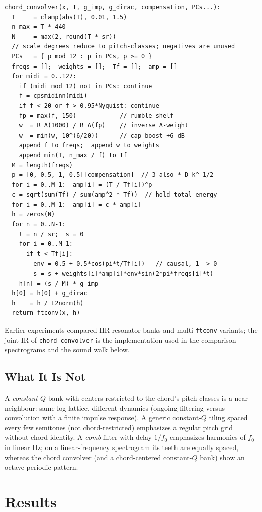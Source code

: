 \documentclass[runningheads,a4paper]{llncs}
\begin{document}
\begin{verbatim}
chord_convolver(x, T, g_imp, g_dirac, compensation, PCs...):
  T     = clamp(abs(T), 0.01, 1.5)
  n_max = T * 440
  N     = max(2, round(T * sr))
  // scale degrees reduce to pitch-classes; negatives are unused
  PCs   = { p mod 12 : p in PCs, p >= 0 }
  freqs = [];  weights = [];  Tf = [];  amp = []
  for midi = 0..127:
    if (midi mod 12) not in PCs: continue
    f = cpsmidinn(midi)
    if f < 20 or f > 0.95*Nyquist: continue
    fp = max(f, 150)            // rumble shelf
    w  = R_A(1000) / R_A(fp)    // inverse A-weight
    w  = min(w, 10^(6/20))      // cap boost +6 dB
    append f to freqs;  append w to weights
    append min(T, n_max / f) to Tf
  M = length(freqs)
  p = [0, 0.5, 1, 0.5][compensation]  // 3 also * D_k^-1/2
  for i = 0..M-1:  amp[i] = (T / Tf[i])^p
  c = sqrt(sum(Tf) / sum(amp^2 * Tf))  // hold total energy
  for i = 0..M-1:  amp[i] = c * amp[i]
  h = zeros(N)
  for n = 0..N-1:
    t = n / sr;  s = 0
    for i = 0..M-1:
      if t < Tf[i]:
        env = 0.5 + 0.5*cos(pi*t/Tf[i])   // causal, 1 -> 0
        s = s + weights[i]*amp[i]*env*sin(2*pi*freqs[i]*t)
    h[n] = (s / M) * g_imp
  h[0] = h[0] + g_dirac
  h    = h / L2norm(h)
  return ftconv(x, h)
\end{verbatim}

Earlier experiments compared IIR resonator banks and multi-\texttt{ftconv}
variants; the joint IR of \texttt{chord\_convolver} is the implementation used
in the comparison spectrograms and the sound walk below.

\subsection{What It Is Not}

A \emph{constant-$Q$} bank with centers restricted to the chord's pitch-classes
is a near neighbour: same log lattice, different dynamics (ongoing filtering
versus convolution with a finite impulse response). A generic constant-$Q$ tiling spaced
every few semitones (not chord-restricted) emphasizes a regular pitch grid
without chord identity. A \emph{comb} filter with delay $1/f_0$ emphasizes
harmonics of $f_0$ in linear Hz; on a linear-frequency spectrogram its teeth
are equally spaced, whereas the chord convolver (and a chord-centered
constant-$Q$ bank) show an octave-periodic pattern.

\section{Results}
\end{document}
